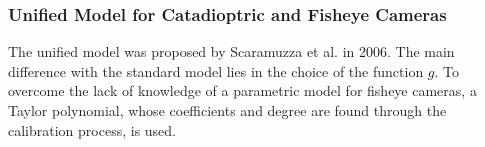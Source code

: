 \subsubsection{Unified Model for Catadioptric and Fisheye Cameras}
The unified model was proposed by Scaramuzza et al. in 2006. The main difference with the standard model lies in the choice of the function $g$. To overcome the lack of knowledge of a parametric model for fisheye cameras, a Taylor polynomial, whose coefficients and degree are found through the calibration process, is used.
